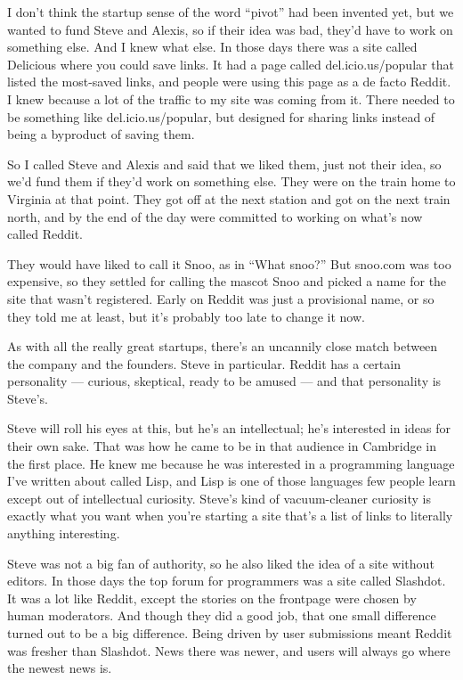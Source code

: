 \documentclass[12pt]{book}
\begin{document}
I don't think the startup sense of the word ``pivot'' had been invented
yet, but we wanted to fund Steve and Alexis, so if their idea was bad,
they'd have to work on something else. And I knew what else. In those
days there was a site called Delicious where you could save links. It
had a page called del.icio.us/popular that listed the most-saved links,
and people were using this page as a de facto Reddit. I knew because a
lot of the traffic to my site was coming from it. There needed to be
something like del.icio.us/popular, but designed for sharing links
instead of being a byproduct of saving them.

So I called Steve and Alexis and said that we liked them, just not their
idea, so we'd fund them if they'd work on something else. They were on
the train home to Virginia at that point. They got off at the next
station and got on the next train north, and by the end of the day were
committed to working on what's now called Reddit.

They would have liked to call it Snoo, as in ``What snoo?'' But snoo.com
was too expensive, so they settled for calling the mascot Snoo and
picked a name for the site that wasn't registered. Early on Reddit was
just a provisional name, or so they told me at least, but it's probably
too late to change it now.

As with all the really great startups, there's an uncannily close match
between the company and the founders. Steve in particular. Reddit has a
certain personality --- curious, skeptical, ready to be amused --- and
that personality is Steve's.

Steve will roll his eyes at this, but he's an intellectual; he's
interested in ideas for their own sake. That was how he came to be in
that audience in Cambridge in the first place. He knew me because he was
interested in a programming language I've written about called Lisp, and
Lisp is one of those languages few people learn except out of
intellectual curiosity. Steve's kind of vacuum-cleaner curiosity is
exactly what you want when you're starting a site that's a list of links
to literally anything interesting.

Steve was not a big fan of authority, so he also liked the idea of a
site without editors. In those days the top forum for programmers was a
site called Slashdot. It was a lot like Reddit, except the stories on
the frontpage were chosen by human moderators. And though they did a
good job, that one small difference turned out to be a big difference.
Being driven by user submissions meant Reddit was fresher than Slashdot.
News there was newer, and users will always go where the newest news is.
\end{document}
